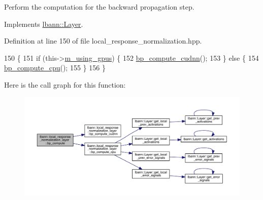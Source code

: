 Perform the computation for the backward propagation step. 

Implements \hyperlink{classlbann_1_1Layer_a7442e01f9ee1294df2de811efcf5171e}{lbann\+::\+Layer}.



Definition at line 150 of file local\+\_\+response\+\_\+normalization.\+hpp.


\begin{DoxyCode}
150                              \{
151     \textcolor{keywordflow}{if} (this->\hyperlink{classlbann_1_1Layer_af7881cb5eff5207c15fa835d65462e8f}{m\_using\_gpus}) \{
152       \hyperlink{classlbann_1_1local__response__normalization__layer_a78b0d081956abf4f09874d59b4bf4fc8}{bp\_compute\_cudnn}();
153     \} \textcolor{keywordflow}{else} \{
154       \hyperlink{classlbann_1_1local__response__normalization__layer_a1aac4bf5e2500749bc8bafcd254f5699}{bp\_compute\_cpu}();
155     \}
156   \}
\end{DoxyCode}
Here is the call graph for this function\+:\nopagebreak
\begin{figure}[H]
\begin{center}
\leavevmode
\includegraphics[width=350pt]{classlbann_1_1local__response__normalization__layer_ae94544765a459a6609f2c2ebbbc3e9d9_cgraph}
\end{center}
\end{figure}
\mbox{\label{classlbann_1_1local__response__normalization__layer_a1aac4bf5e2500749bc8bafcd254f5699}} 
